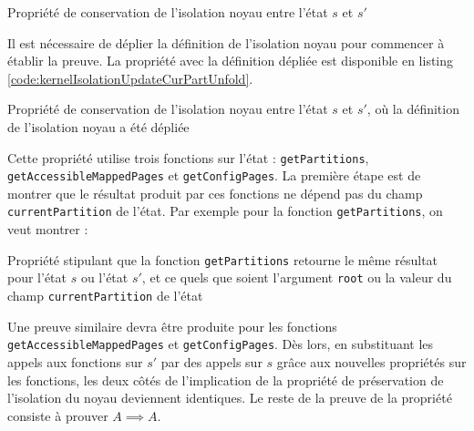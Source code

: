 			\begin{listing}[!ht]
				\caption{Propriété de conservation de l'isolation noyau entre l'état $s$ et $s'$}
				\label{code:kernelIsolationUpdateCurPart}
			\end{listing}
			\label{sec:curPartKernelIsolation}

			Il est nécessaire de déplier la définition de l'isolation noyau pour commencer à établir la preuve. La propriété avec la définition dépliée est disponible en listing \ref{code:kernelIsolationUpdateCurPartUnfold}.

			\begin{listing}[!ht]
				\caption{Propriété de conservation de l'isolation noyau entre l'état $s$ et $s'$, où la définition de l'isolation noyau a été dépliée}
				\label{code:kernelIsolationUpdateCurPartUnfold}
			\end{listing}

			Cette propriété utilise trois fonctions sur l'état : \texttt{getPartitions}, \texttt{getAccessibleMappedPages} et \texttt{getConfigPages}. La première étape est de montrer que le résultat produit par ces fonctions ne dépend pas du champ \texttt{currentPartition} de l'état. Par exemple pour la fonction \texttt{getPartitions}, on veut montrer :

			\begin{listing}[!ht]
				\caption{Propriété stipulant que la fonction \texttt{getPartitions} retourne le même résultat pour l'état $s$ ou l'état $s'$, et ce quels que soient l'argument \texttt{root} ou la valeur du champ \texttt{currentPartition} de l'état}
				\label{code:partitionTreeRemains}
			\end{listing}

			Une preuve similaire devra être produite pour les fonctions \texttt{getAccessibleMappedPages} et \texttt{getConfigPages}. Dès lors, en substituant les appels aux fonctions sur $s'$ par des appels sur $s$ grâce aux nouvelles propriétés sur les fonctions, les deux côtés de l'implication de la propriété de préservation de l'isolation du noyau deviennent identiques. Le reste de la preuve de la propriété consiste à prouver $A \implies A$.\\

